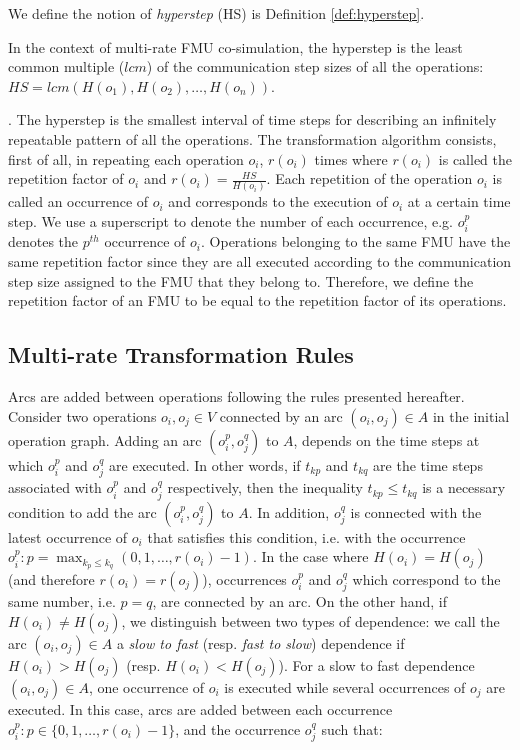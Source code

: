 We define the notion of \textit{hyperstep} (HS) is Definition \ref{def:hyperstep}. 

\begin{definition}
In the context of multi-rate FMU co-simulation, the hyperstep is the least common multiple ($lcm$) of the communication step sizes of all the operations: $HS=lcm(H(o_1),H(o_2), \dots ,H(o_n))$.
\label{def:hyperstep}
\end{definition}
. The hyperstep is the smallest interval of time steps for describing an infinitely repeatable pattern of all the operations. The transformation algorithm consists, first of all, in repeating each operation $o_i$, $r(o_i)$ times where $r(o_i)$ is called the repetition factor of $o_i$ and $r(o_i) = \frac{HS}{H(o_i)}$. Each repetition of the operation $o_i$ is called an occurrence of $o_i$ and corresponds to the execution of $o_i$ at a certain time step. We use a superscript to denote the number of each occurrence, e.g. $o_i^p$ denotes the $p^{th}$ occurrence of $o_i$. Operations belonging to the same FMU have the same repetition factor since they are all executed according to the communication step size assigned to the FMU that they belong to. Therefore, we define the repetition factor of an FMU to be equal to the repetition factor of its operations. 

\subsection{Multi-rate Transformation Rules}

Arcs are added between operations following the rules presented hereafter. Consider two operations $o_i, o_j \in V$ connected by an arc $(o_i,o_j) \in A$ in the initial operation graph. Adding an arc $(o_i^p,o_j^q)$ to $A$, depends on the time steps at which $o_i^p$ and $o_j^q$ are executed. In other words, if $t_{kp}$ and $t_{kq}$ are the time steps associated with $o_i^p$ and $o_j^q$ respectively, then the inequality $t_{kp} \leq t_{kq}$ is a necessary condition to add the arc $(o_i^p,o_j^q)$ to $A$. In addition, $o_j^q$ is connected with the latest occurrence of $o_i$ that satisfies this condition, i.e. with the occurrence $o_i^p: p=\max_{k_{p} \leq k_{q}}(0,1, \dots ,r(o_i)-1)$. In the case where $H(o_i) = H(o_j)$ (and therefore $r(o_i) = r(o_j)$), occurrences $o_i^p$ and $o_j^q$ which correspond to the same number, i.e. $p = q$, are connected by an arc. On the other hand, if $H(o_i) \neq H(o_j)$, we distinguish between two types of dependence: we call the arc $(o_i,o_j) \in A$ a \textit{slow to fast} (resp. \textit{fast to slow}) dependence if $H(o_i) > H(o_j)$ (resp. $H(o_i) < H(o_j)$). For a slow to fast dependence $(o_i,o_j) \in A$, one occurrence of $o_i$ is executed while several occurrences of $o_j$ are executed. In this case, arcs are added between each occurrence $o_i^p: p \in \{0,1, \dots ,r(o_i)-1\}$, and the occurrence $o_j^q$ such that:

